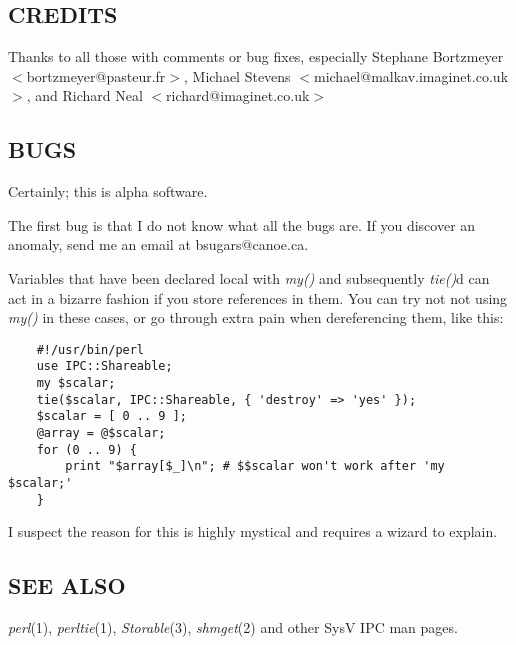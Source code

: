 \subsection*{CREDITS}%

Thanks to all those with comments or bug fixes, especially Stephane
Bortzmeyer $<$bortzmeyer@pasteur.fr$>$, Michael Stevens
$<$michael@malkav.imaginet.co.uk$>$, and Richard Neal
$<$richard@imaginet.co.uk$>$

\subsection*{BUGS}
Certainly; this is alpha software.

The first bug is that I do not know what all the bugs are. If you
discover an anomaly, send me an email at bsugars@canoe.ca.

Variables that have been declared local with {\em my()\/} and subsequently
{\em tie()\/}d can act in a bizarre fashion if you store references in them.
You can try not not using {\em my()\/} in these cases, or go through extra
pain when dereferencing them, like this:
\begin{verbatim}
    #!/usr/bin/perl
    use IPC::Shareable;
    my $scalar;
    tie($scalar, IPC::Shareable, { 'destroy' => 'yes' });
    $scalar = [ 0 .. 9 ];
    @array = @$scalar;
    for (0 .. 9) {
        print "$array[$_]\n"; # $$scalar won't work after 'my $scalar;'
    }
\end{verbatim}

I suspect the reason for this is highly mystical and requires a wizard
to explain.

\subsection*{SEE ALSO}
{\em perl\/}(1), {\em perltie\/}(1), {\em Storable\/}(3), {\em shmget\/}(2) and other SysV IPC man
pages.

